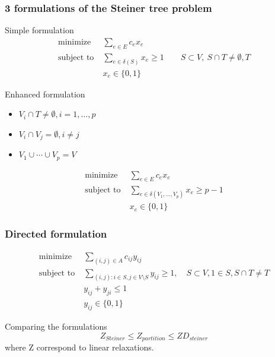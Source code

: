 \documentclass[9pt,handout]{beamer}
\begin{document}
\begin{frame}
\frametitle{3 formulations of the Steiner tree problem}
\begin{block}{Simple formulation}
\begin{align*} 
\text{minimize} \;&\sum_{e\in E} c_ex_e\\
\text{subject to}\;& \sum_{e\in \delta(S)} x_e \geq 1 \qquad S\subset V,\ S\cap T \neq \emptyset,T\\
& x_e\in \{0,1\}
\end{align*}
\end{block}
\begin{block}{Enhanced formulation}
\begin{itemize}
\item<1-> $V_i\cap T\neq \emptyset, i=1,\ldots, p$
\item<1-> $V_i\cap V_j=\emptyset, i\neq j$
\item<1-> $V_1 \cup \cdots \cup V_p = V$
\end{itemize}
\begin{align*} 
\text{minimize} \;&\sum_{e\in E} c_ex_e\\
\text{subject to}\;& \sum_{e\in \delta(V_1,\ldots,V_p)} x_e \geq p-1 \\
& x_e\in \{0,1\}
\end{align*}
\end{block}
\end{frame}
\begin{frame}
\frametitle{Directed formulation}
\begin{align*}
\text{minimize}\; & \sum_{(i,j)\in A} c_{ij} y_{ij}\\
\text{subject to}\; & \sum_{(i,j): i\in S, j\in V\setminus S} y_{ij} \geq 1, \quad S\subset V, 1\in S, S\cap T\neq T\\
& y_{ij}+y_{ji}\leq 1\\
& y_{ij}\in \{0,1\}
\end{align*}
\begin{block}{Comparing the formulations}
$$Z_{Steiner} \leq Z_{partition} \leq ZD_{steiner}$$
where Z correspond to \alert{linear relaxations}.
\end{block}
\end{frame}
\end{document}
